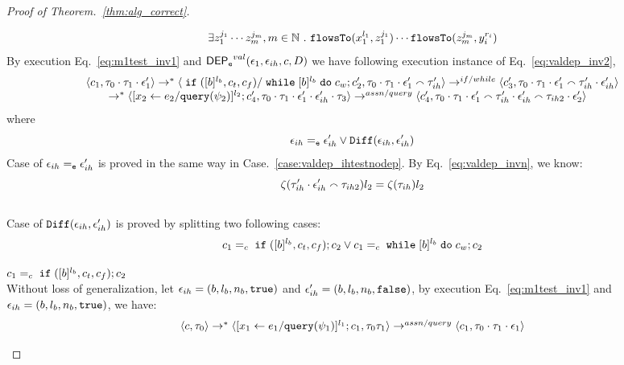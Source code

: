 \begin{proof}[Proof of Theorem.~\ref{thm:alg_correct}]
\begin{case}
\begin{subcase}
\begin{subsubcase}
\begin{subsubsubcase}
\begin{equation}
  \exists z_1^{j_1} \cdots z_m^{j_m}, m \in \mathbb{N} ~.~ 
  \mathtt{flowsTo}(x_1^{l_1}, z_1^{j_1}) \cdots \mathtt{flowsTo}(z_m^{j_m}, y_i^{r_i})
\end{equation}
%
By execution Eq.~\ref{eq:m1test_inv1} and $\mathsf{DEP_{\mathtt{e}}}^{val}(\mathtt{\epsilon}_1, \mathtt{\epsilon}_{ih}, c, D)$ we have following execution instance of Eq.~\ref{eq:valdep_inv2},
\begin{equation}
\label{eq:m1test_inv2}
  \begin{array}{l}   
  \langle c_1, \mathtt{\tau}_0 \cdot \mathtt{\tau}_1 \cdot \mathtt{\epsilon}_1' \rangle 
  \rightarrow^{*} 
  \langle \;\mathtt{if}\; ([b]^{l_b}, c_t, c_f) / \;\mathtt{while}\; [b]^{l_b} \;\mathtt{do}\; c_w ; {c}_2', \mathtt{\tau}_0 \cdot \mathtt{\tau}_1 \cdot \mathtt{\epsilon}_1' \smallfrown \mathtt{\tau}_{ih}' \rangle 
  \rightarrow^{if / while} 
  \langle c_3', \mathtt{\tau}_0 \cdot \mathtt{\tau}_1 \cdot \mathtt{\epsilon}_1'  \smallfrown \mathtt{\tau}_{ih}' \cdot \mathtt{\epsilon}_{ih}' \rangle 
  \\
  \qquad \rightarrow^{*} 
  \langle [\mathrel{ {x}_2 \leftarrow e_2 / {\tt query}(\psi_2) }]^{l_2};{c}_4', 
  \mathtt{\tau}_0 \cdot \mathtt{\tau}_1 \cdot \mathtt{\epsilon}_1' \cdot \mathtt{\epsilon}_{ih}' \cdot \mathtt{\tau}_3 \rangle
  \rightarrow^{assn/query} 
  \langle {c}_4',  \mathtt{\tau}_0 \cdot \mathtt{\tau}_1 \cdot \mathtt{\epsilon}_1' \smallfrown \mathtt{\tau}_{ih}' \cdot \mathtt{\epsilon}_{ih}' \smallfrown \mathtt{\tau}_{ih2} \cdot \mathtt{\epsilon}_2' \rangle 
\end{array}
\end{equation}
where 
\[
  \mathtt{\epsilon}_{ih} =_{\mathtt{e}} \mathtt{\epsilon}_{ih}' \lor \mathtt{Diff}(\mathtt{\epsilon}_{ih}, \mathtt{\epsilon}_{ih}')
\]
%
Case of $\mathtt{\epsilon}_{ih} =_{\mathtt{e}} \mathtt{\epsilon}_{ih}'$ is proved in the same way in Case.~\ref{case:valdep_ihtestnodep}.
%
By Eq.~\ref{eq:valdep_invn}, we know:
%
\[
\mathtt{\zeta}(\mathtt{\tau}_{ih}' \cdot \mathtt{\epsilon}_{ih}' \smallfrown \mathtt{\tau}_{ih2}) l_2  = \mathtt{\zeta}(\mathtt{\tau}_{ih}) l_2 
 \]
%
\\
Case of $\mathtt{Diff}(\mathtt{\epsilon}_{ih}, \mathtt{\epsilon}_{ih}')$ is proved by splitting two following cases:
\[
  c_1 =_c \;\mathtt{if}\; ([b]^{l_b}, c_t, c_f);{c}_2
  \lor
  c_1 =_c \;\mathtt{while}\; [b]^{l_b} \;\mathtt{do}\; c_w;{c}_2
\]
\begin{subproof} 
%
$c_1 =_c \;\mathtt{if}\; ([b]^{l_b}, c_t, c_f);{c}_2$ 
\\
Without loss of generalization, 
let $\mathtt{\epsilon}_{ih} = (b, l_b, n_b, \mathtt{true})$ and
$\mathtt{\epsilon}_{ih}' = (b, l_b, n_b, \mathtt{false})$,
by execution Eq.~\ref{eq:m1test_inv1} and $\mathtt{\epsilon}_{ih} = (b, l_b, n_b, \mathtt{true})$, we have:
\[
  \begin{array}{l}   
  \langle {c}, \mathtt{\tau}_0 \rangle \rightarrow^{*} 
  \langle [\mathrel{ {x}_1 \leftarrow e_1 / {\tt query}(\psi_1) }]^{l_1} ; {c}_1, \mathtt{\tau}_0 \mathtt{\tau}_1 \rangle  
  \rightarrow^{assn/query}
  \langle c_1, \mathtt{\tau}_0 \cdot \mathtt{\tau}_1 \cdot \mathtt{\epsilon}_1 \rangle 
  \\

\end{array}\]
\end{subproof}
\end{subsubsubcase}
\end{subsubcase}
\end{subcase}
\end{case}
\end{proof}
